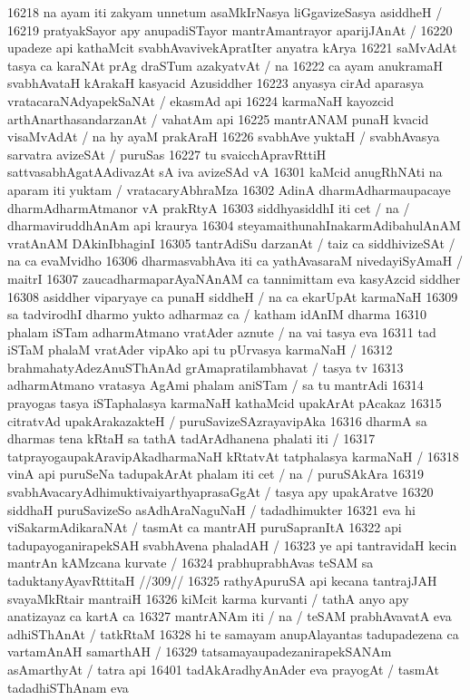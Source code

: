 16218 na ayam iti zakyam unnetum asaMkIrNasya liGgavizeSasya asiddheH / 
16219 pratyakSayor apy anupadiSTayor mantrAmantrayor aparijJAnAt / 
16220 upadeze api kathaMcit svabhAvavivekApratIter anyatra kArya
16221 saMvAdAt tasya ca karaNAt prAg draSTum azakyatvAt / na
16222 ca ayam anukramaH svabhAvataH kArakaH kasyacid Azusiddher 
16223 anyasya cirAd aparasya vratacaraNAdyapekSaNAt / ekasmAd api 
16224 karmaNaH kayozcid arthAnarthasandarzanAt / vahatAm api
16225 mantrANAM punaH kvacid visaMvAdAt / na hy ayaM prakAraH  
16226 svabhAve yuktaH / svabhAvasya sarvatra avizeSAt / puruSas  
16227 tu svaicchApravRttiH sattvasabhAgatAAdivazAt sA iva avizeSAd vA
16301 kaMcid anugRhNAti na aparam iti yuktam / vratacaryAbhraMza  
16302 AdinA dharmAdharmaupacaye dharmAdharmAtmanor vA prakRtyA
16303 siddhyasiddhI iti cet / na / dharmaviruddhAnAm api kraurya 
16304 steyamaithunahInakarmAdibahulAnAM vratAnAM DAkinIbhaginI 
16305 tantrAdiSu darzanAt / taiz ca siddhivizeSAt / na ca evaMvidho 
16306 dharmasvabhAva iti ca yathAvasaraM nivedayiSyAmaH / maitrI 
16307 zaucadharmaparAyaNAnAM ca tannimittam eva kasyAzcid siddher  
16308 asiddher viparyaye ca punaH siddheH / na ca ekarUpAt karmaNaH 
16309 sa tadvirodhI dharmo yukto adharmaz ca / katham idAnIM dharma  
16310 phalam iSTam adharmAtmano vratAder aznute / na vai tasya eva  
16311 tad iSTaM phalaM vratAder vipAko api tu pUrvasya karmaNaH / 
16312 brahmahatyAdezAnuSThAnAd grAmapratilambhavat / tasya tv
16313 adharmAtmano vratasya AgAmi phalam aniSTam / sa tu mantrAdi
16314 prayogas tasya iSTaphalasya karmaNaH kathaMcid upakArAt pAcakaz 
16315 citratvAd upakArakazakteH / puruSavizeSAzrayavipAka 
16316 dharmA sa dharmas tena kRtaH sa tathA tadArAdhanena phalati iti / 
16317 tatprayogaupakAravipAkadharmaNaH kRtatvAt tatphalasya karmaNaH /  
16318 vinA api puruSeNa tadupakArAt phalam iti cet / na / puruSAkAra
16319 svabhAvacaryAdhimuktivaiyarthyaprasaGgAt / tasya apy upakAratve
16320 siddhaH puruSavizeSo asAdhAraNaguNaH / tadadhimukter  
16321 eva hi viSakarmAdikaraNAt / tasmAt ca mantrAH puruSapranItA 
16322 api tadupayoganirapekSAH svabhAvena phaladAH /  
16323 	ye api tantravidaH kecin mantrAn kAMzcana kurvate / 
16324 	prabhuprabhAvas teSAM sa taduktanyAyavRttitaH //309//
16325 rathyApuruSA api kecana tantrajJAH svayaMkRtair mantraiH  
16326 kiMcit karma kurvanti / tathA anyo apy anatizayaz ca kartA ca  
16327 mantrANAm iti / na / teSAM prabhAvavatA eva adhiSThAnAt / tatkRtaM
16328 hi te samayam anupAlayantas tadupadezena ca vartamAnAH samarthAH /
16329 tatsamayaupadezanirapekSANAm asAmarthyAt / tatra api
16401 tadAkAradhyAnAder eva prayogAt / tasmAt tadadhiSThAnam eva 

